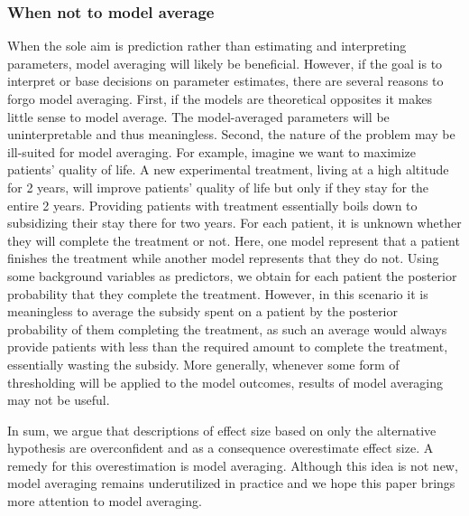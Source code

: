 \documentclass[a4paper]{article}
\begin{document}
\subsubsection*{When not to model average}
When the sole aim is prediction rather than estimating and interpreting parameters, model averaging will likely be beneficial. However, if the goal is to interpret or base decisions on parameter estimates, there are several reasons to forgo model averaging. First, if the models are theoretical opposites it makes little sense to model average. The model-averaged parameters will be uninterpretable and thus meaningless. Second, the nature of the problem may be ill-suited for model averaging. For example, imagine we want to maximize patients' quality of life. A new experimental treatment, living at a high altitude for 2 years, will improve patients' quality of life but only if they stay for the entire 2 years. Providing patients with treatment essentially boils down to subsidizing their stay there for two years. For each patient, it is unknown whether they will complete the treatment or not. Here, one model represent that a patient finishes the treatment while another model represents that they do not. Using some background variables as predictors, we obtain for each patient the posterior probability that they complete the treatment. However, in this scenario it is meaningless to average the subsidy spent on a patient by the posterior probability of them completing the treatment, as such an average would always provide patients with less than the required amount to complete the treatment, essentially wasting the subsidy. More generally, whenever some form of thresholding will be applied to the model outcomes, results of model averaging may not be useful.

In sum, we argue that descriptions of effect size based on only the alternative hypothesis are overconfident and as a consequence overestimate effect size. A remedy for this overestimation is model averaging. Although this idea is not new, model averaging remains underutilized in practice and we hope this paper brings more attention to model averaging.




\end{document}
